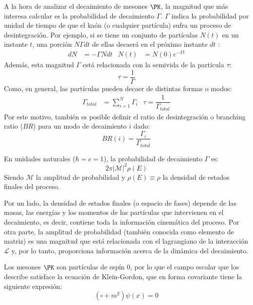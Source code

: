 A la hora de analizar el decaimiento de mesones $\PK$, la magnitud que más interesa calcular es la probabilidad de decaimiento $\Gamma$. $\Gamma$ indica la probabilidad por unidad de tiempo de que el kaón (o cualquier partícula) sufra un proceso de desintegración. Por ejemplo, si se tiene un conjunto de partículas $N(t)$ en un instante $t$, una porción $N\Gamma dt$ de ellas decaerá en el próximo instante $dt$ \cite{Griffiths2008}:
\begin{align}
dN &= -\Gamma Ndt & N(t) &= N(0)e^{-\Gamma t}
\end{align}
Además, esta magnitud $\Gamma$ está relacionada con la semivida de la partícula $\tau$:
\begin{equation}
\tau=\dfrac{1}{\Gamma}\label{eq:meanlife}
\end{equation}
Como, en general, las partículas pueden decaer de distintas formas o modos:
\begin{align}
\Gamma_{total} &= \sum_{i=1}^N \Gamma_i & \tau=\dfrac{1}{\Gamma_{total}}
\end{align}
Por este motivo, también es posible definir el ratio de desintegración o branching ratio ($BR$) para un modo de decaimiento $i$ dado:
\begin{equation}
BR(i)=\dfrac{\Gamma_{i}}{\Gamma_{total}}
\end{equation}

En unidades naturales ($\hbar=c=1$), la probabilidad de decaimiento $\Gamma$ es:
\begin{equation}
2\pi \left| \mathcal{M}\right| ^{2} \rho\left( E\right)
\end{equation} 
Siendo $\mathcal{M}$ la amplitud de probabilidad y $\rho\left(E\right) \equiv \rho$ la densidad de estados finales del proceso.

Por un lado, la densidad de estados finales (o espacio de fases) depende de las masas, las energías y los momentos de las partículas que intervienen en el decaimiento, es decir, contiene toda la información cinemática del proceso. Por otra parte, la amplitud de probabilidad (también conocida como elemento de matriz) es una magnitud que está relacionada con el lagrangiano de la interacción $\mathcal{L}$ y, por lo tanto, proporciona información acerca de la dinámica del decaimiento. 

Los mesones $\PK$ son partículas de espín 0, por lo que el campo escalar que los describe satisface la ecuación de Klein-Gordon, que en forma covariante tiene la siguiente expresión:
\begin{equation}
\left( \square +m^{2}\right) \psi \left( x\right) =0
\end{equation}

